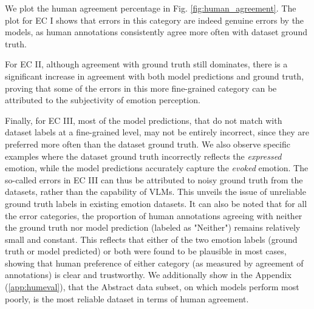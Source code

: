 We plot the human agreement percentage in Fig. \ref{fig:human_agreement}. The plot for EC I shows that errors in this category are indeed genuine errors by the models, as human annotations consistently agree more often with dataset ground truth. 

For EC II, although agreement with ground truth still dominates, there is a significant increase in agreement with both model predictions and ground truth, proving that some of the errors in this more fine-grained category can be attributed to the subjectivity of emotion perception. 

Finally, for EC III, most of the model predictions, that do not match with dataset labels at a fine-grained level, may not be entirely incorrect, since they are preferred more often than the dataset ground truth. We also observe specific examples where the dataset ground truth incorrectly reflects the \textit{expressed} emotion, while the model predictions accurately capture the \textit{evoked} emotion. The so-called errors in EC III can thus be attributed to noisy ground truth from the datasets, rather than the capability of VLMs. This unveils the issue of unreliable ground truth labels in existing emotion datasets. It can also be noted that for all the error categories, the proportion of human annotations agreeing with neither the ground truth nor model prediction (labeled as "Neither") remains relatively small and constant. This reflects that either of the two emotion labels (ground truth or model predicted) or both were found to be plausible in most cases, showing that human preference of either category (as measured by agreement of annotations) is clear and trustworthy. We additionally show in the Appendix (\ref{app:humeval}), that the Abstract data subset, on which models perform most poorly, is the most reliable dataset in terms of human agreement.









